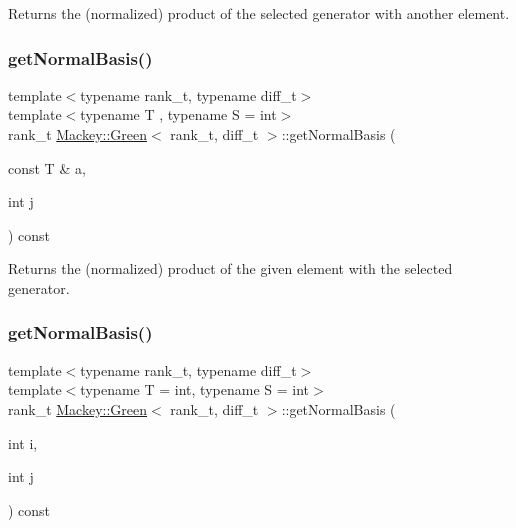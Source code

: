 Returns the (normalized) product of the selected generator with another element. 

\mbox{\label{classMackey_1_1Green_a7e2d97abb22044ec3abbe91bc9c33ee9}} 
\subsubsection{\texorpdfstring{get\+Normal\+Basis()}{getNormalBasis()}\hspace{0.1cm}{\footnotesize\ttfamily [3/4]}}
{\footnotesize\ttfamily template$<$typename rank\+\_\+t, typename diff\+\_\+t$>$ \\
template$<$typename T , typename S  = int$>$ \\
rank\+\_\+t \hyperlink{classMackey_1_1Green}{Mackey\+::\+Green}$<$ rank\+\_\+t, diff\+\_\+t $>$\+::get\+Normal\+Basis (\begin{DoxyParamCaption}\item[{const T \&}]{a,  }\item[{int}]{j }\end{DoxyParamCaption}) const\hspace{0.3cm}{\ttfamily [inline]}}



Returns the (normalized) product of the given element with the selected generator. 

\mbox{\label{classMackey_1_1Green_a3f7f1f3a020f23a00fae372956f50827}} 
\subsubsection{\texorpdfstring{get\+Normal\+Basis()}{getNormalBasis()}\hspace{0.1cm}{\footnotesize\ttfamily [4/4]}}
{\footnotesize\ttfamily template$<$typename rank\+\_\+t, typename diff\+\_\+t$>$ \\
template$<$typename T  = int, typename S  = int$>$ \\
rank\+\_\+t \hyperlink{classMackey_1_1Green}{Mackey\+::\+Green}$<$ rank\+\_\+t, diff\+\_\+t $>$\+::get\+Normal\+Basis (\begin{DoxyParamCaption}\item[{int}]{i,  }\item[{int}]{j }\end{DoxyParamCaption}) const\hspace{0.3cm}{\ttfamily [inline]}}




